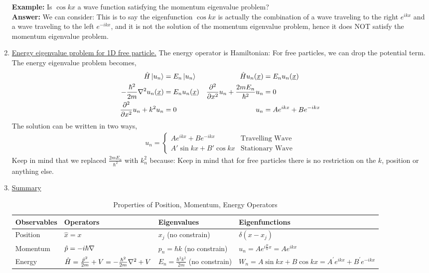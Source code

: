 \documentclass{school-22.101-notes}
\begin{document}
\begin{enumerate}
\textbf{Example:} Is $\cos kx$ a wave function satisfying the momentum eigenvalue problem? \\
\textbf{Answer:} We can consider:
This is to say the eigenfunction $\cos kx$ is actually the combination of a wave traveling to the right $e^{ikx}$ and a wave traveling to the left $e^{-ikx}$, and it is not the solution of the momentum eigenvalue problem, hence it does NOT satisfy the momentum eigenvalue problem. 


\item \uline{Energy eigenvalue problem for 1D free particle.} The energy operator is Hamiltonian: 
For free particles, we can drop the potential term. The energy eigenvalue problem becomes,
\begin{align}
  \hat{H} \left| u_n \right> &= E_n \left| u_n \right> &  \hat{H} u_n (\underline{x}) &= E_n u_n (\underline{x} ) \\
  -\frac{\hbar^2}{2m} \nabla^2 u_n (\underline{x}) &= E_n u_n (\underline{x} )  &  \frac{\partial^{2} }{\partial x ^{2}} u_n + \frac{2m E_n}{\hbar^2} u_n &= 0 \\
 \frac{\partial^{2} }{\partial x ^{2}} u_n + k^2 u_n &= 0   & u_n &= A e^{ikx} + B e^{-ikx} 
\end{align}
The solution can be written in two ways, 
\begin{align}
  u_n = \left\{ 
  \begin{array}{cc}
    A e^{ikx} + B e^{-ikx} & \mbox{Travelling Wave} \\
    A' \sin kx + B' \cos kx  & \mbox{Stationary Wave} 
  \end{array}
  \right.
\end{align}
Keep in mind that we replaced $\frac{2m E_n}{\hbar^2}$ with $k_n^2$ because:
Keep in mind that for free particles there is no restriction on the $k$, position or anything else. 


\item \uline{Summary}
\begin{table}[ht]
\begin{tabular}{|l|p{1.6in}|l|p{2in}|} \hline
Observables & Operators & Eigenvalues & Eigenfunctions \\ \hline
Position & $\hat{x} = x$ & $x_j$ (no constrain) & $\delta(x-x_j)$ \\ \hline
Momentum & $\hat{p} = - i \hbar \nabla $ & $p_n = \hbar k$ (no constrain) & $u_n = A e^{i \frac{p}{\hbar} x } = A e^{i k x} $ \\ \hline
Energy & $\hat{H} = \frac{\hat{p}^2}{2m} + V = - \frac{\hbar^2}{2m} \nabla^2 + V$ & $E_n = \frac{\hbar^2 k^2}{2m}$ (no constrain) & $W_n = A \sin kx + B \cos kx = A^{\prime} e^{ikx} + B^{\prime} e^{-ikx} $\\ \hline
\end{tabular}
\caption{Properties of Position, Momentum, Energy Operators}
\end{table}


\end{enumerate}
\end{document}
